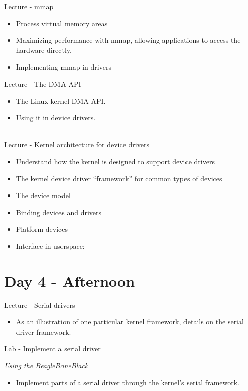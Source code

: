 \documentclass[a4paper,12pt,obeyspaces,spaces,hyphens]{article}
\begin{document}
\feagendatwocolumn
{Lecture - mmap}
{
  \begin{itemize}
  \item Process virtual memory areas
  \item Maximizing performance with mmap, allowing applications to
    access the hardware directly.
  \item Implementing mmap in drivers
  \end{itemize}
}
{Lecture - The DMA API}
{
  \begin{itemize}
  \item The Linux kernel DMA API.
  \item Using it in device drivers.
  \end{itemize}
}
\\
\feagendaonecolumn
{Lecture - Kernel architecture for device drivers}
{
  \begin{itemize}
  \item Understand how the kernel is designed to support device
    drivers
  \item The kernel device driver ``framework'' for common types of
    devices
  \item The device model
  \item Binding devices and drivers
  \item Platform devices
  \item Interface in userspace: 
  \end{itemize}
}

\section{Day 4 - Afternoon}

\feagendatwocolumn
{Lecture - Serial drivers}
{
  \begin{itemize}
  \item As an illustration of one particular kernel framework, details
    on the serial driver framework.
  \end{itemize}
}
{Lab - Implement a serial driver}
{
  {\em Using the BeagleBoneBlack}
  \begin{itemize}
  \item Implement parts of a serial driver through the kernel's serial
    framework.
  \end{itemize}
}
\end{document}
